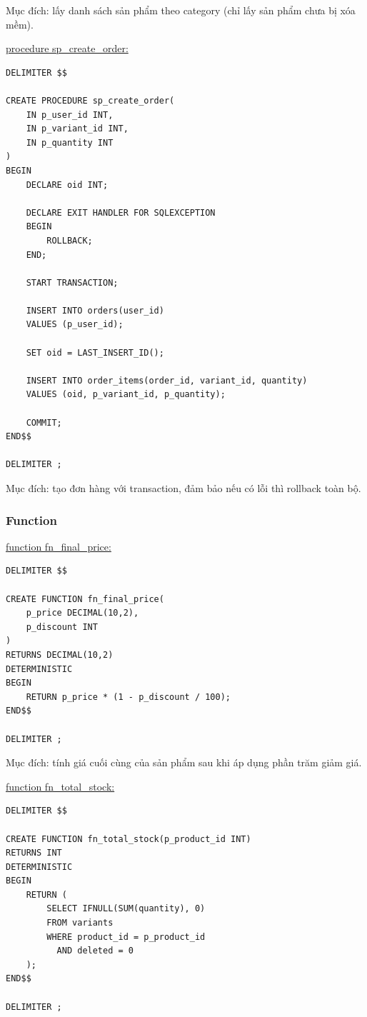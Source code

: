Mục đích: lấy danh sách sản phẩm theo category (chỉ lấy sản phẩm chưa bị xóa mềm).

\underline{procedure sp\_create\_order:}

\begin{verbatim}
DELIMITER $$

CREATE PROCEDURE sp_create_order(
    IN p_user_id INT,
    IN p_variant_id INT,
    IN p_quantity INT
)
BEGIN
    DECLARE oid INT;

    DECLARE EXIT HANDLER FOR SQLEXCEPTION
    BEGIN
        ROLLBACK;
    END;

    START TRANSACTION;

    INSERT INTO orders(user_id)
    VALUES (p_user_id);

    SET oid = LAST_INSERT_ID();

    INSERT INTO order_items(order_id, variant_id, quantity)
    VALUES (oid, p_variant_id, p_quantity);

    COMMIT;
END$$

DELIMITER ;
\end{verbatim}

Mục đích: tạo đơn hàng với transaction, đảm bảo nếu có lỗi thì rollback toàn bộ.

\subsubsection{Function}

\underline{function fn\_final\_price:}

\begin{verbatim}
DELIMITER $$

CREATE FUNCTION fn_final_price(
    p_price DECIMAL(10,2),
    p_discount INT
)
RETURNS DECIMAL(10,2)
DETERMINISTIC
BEGIN
    RETURN p_price * (1 - p_discount / 100);
END$$

DELIMITER ;
\end{verbatim}

Mục đích: tính giá cuối cùng của sản phẩm sau khi áp dụng phần trăm giảm giá.

\underline{function fn\_total\_stock:}

\begin{verbatim}
DELIMITER $$

CREATE FUNCTION fn_total_stock(p_product_id INT)
RETURNS INT
DETERMINISTIC
BEGIN
    RETURN (
        SELECT IFNULL(SUM(quantity), 0)
        FROM variants
        WHERE product_id = p_product_id
          AND deleted = 0
    );
END$$

DELIMITER ;
\end{verbatim}

